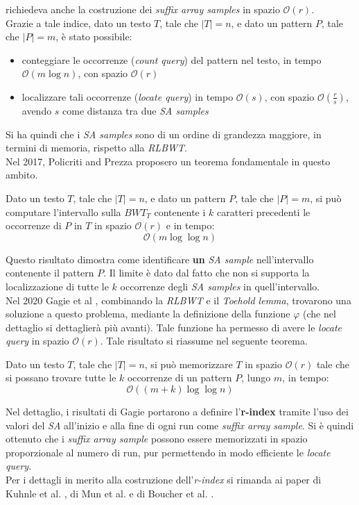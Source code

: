 richiedeva anche la costruzione dei \textit{suffix array samples} in
spazio $\mathcal{O}(r)$. \\
Grazie a tale indice, dato un testo $T$, tale che
$|T|=n$, e dato un pattern $P$, tale che $|P|=m$, è stato possibile: 
\begin{itemize}
  \item conteggiare le occorrenze (\textit{count query}) del pattern nel testo,
  in tempo $\mathcal{O}(m\log n)$, con spazio $\mathcal{O}(r)$  
  \item localizzare tali occorrenze (\textit{locate query}) in tempo
  $\mathcal{O}(s)$, con spazio $\mathcal{O}\left(\frac{r}{s}\right)$, avendo $s$
  come distanza tra due \textit{SA samples}
\end{itemize}
Si ha quindi che i \textit{SA samples} sono di un ordine di grandezza maggiore,
in termini di memoria, rispetto alla \textit{RLBWT}.\\
Nel 2017, Policriti and Prezza \cite{policriti} proposero un teorema
fondamentale in questo ambito.
\begin{teorema}
  Dato un testo $T$, tale che $|T|=n$, e dato un pattern $P$, tale
  che $|P|=m$, si può computare l'intervallo sulla $BWT_T$ contenente i $k$
  caratteri precedenti le occorrenze di $P$ in $T$ in spazio $\mathcal{O}(r)$ e
  in tempo: 
  \[\mathcal{O}(m\log\log n)\]
\end{teorema}
Questo risultato dimostra come identificare \textbf{un} \textit{SA sample}
nell'intervallo 
contenente il pattern $P$. Il limite è dato dal fatto che non si supporta la
localizzazione di tutte le $k$ occorrenze degli \textit{SA samples} in
quell'intervallo.\\
Nel 2020 Gagie et al \cite{gagie2020}, combinando la \textit{RLBWT} e il
\textit{Toehold lemma}, trovarono una soluzione a questo problema, 
mediante la definizione della funzione $\varphi$ (che nel dettaglio si
dettaglierà più avanti). Tale funzione ha permesso di avere le \textit{locate
  query} in spazio $\mathcal{O}(r)$.
Tale risultato si riassume nel seguente teorema.
\begin{teorema}
  Dato un testo $T$, tale che $|T|=n$, si può memorizzare $T$ in spazio
  $\mathcal{O}(r)$ tale che si possano trovare tutte le $k$ occorrenze di un
  pattern $P$, lungo $m$, in tempo:
  \[\mathcal{O}((m+k)\log\log n)\]
\end{teorema}
Nel dettaglio, i risultati di Gagie portarono a definire l'\textbf{r-index}
tramite l'uso dei valori del \textit{SA} all'inizio e alla fine di ogni run come
\textit{suffix array sample}. Si è quindi ottenuto che i \textit{suffix array
  sample} possono essere memorizzati in spazio proporzionale al numero di run,
pur permettendo in modo efficiente le \textit{locate query}.\\
Per i dettagli in merito alla costruzione dell'\textit{r-index} si rimanda ai
paper di Kuhnle et al. \cite{kuhnle}, di Mun et al. \cite{mun} e di Boucher et
al. \cite{boucher}. 
